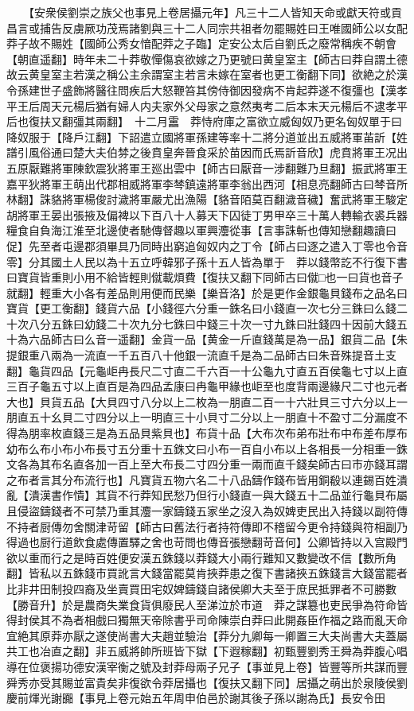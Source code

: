 　　【安衆侯劉崇之族父也事見上卷居攝元年】凡三十二人皆知天命或獻天符或貢昌言或捕告反虜厥功茂焉諸劉與三十二人同宗共祖者勿罷賜姓曰王唯國師公以女配莽子故不賜姓【國師公秀女愔配莽之子臨】定安公太后自劉氏之廢常稱疾不朝會【朝直遥翻】時年未二十莽敬憚傷哀欲嫁之乃更號曰黄皇室主【師古曰莽自謂土德故云黄皇室主若漢之稱公主余謂室主若言未嫁在室者也更工衡翻下同】欲絶之於漢令孫建世子盛飾將醫往問疾后大怒鞭笞其傍侍御因發病不肯起莽遂不復彊也【漢孝平王后周天元楊后猶有婦人内夫家外父母家之意然夷考二后本末天元楊后不逮孝平后也復扶又翻彊其兩翻】　十二月靁　莽恃府庫之富欲立威匈奴乃更名匈奴單于曰降奴服于【降戶江翻】下詔遣立國將軍孫建等率十二將分道並出五威將軍苖訢【姓譜引風俗通曰楚大夫伯棼之後賁皇奔晉食采於苗因而氏焉訢音欣】虎賁將軍王况出五原厭難將軍陳欽震狄將軍王廵出雲中【師古曰厭音一涉翻難乃旦翻】振武將軍王嘉平狄將軍王萌出代郡相威將軍李棽鎮遠將軍李翁出西河【相息亮翻師古曰棽音所林翻】誅貉將軍楊俊討濊將軍嚴尤出漁陽【貉音陌莫百翻濊音穢】奮武將軍王駿定胡將軍王晏出張掖及偏裨以下百八十人募天下囚徒丁男甲卒三十萬人轉輸衣裘兵器糧食自負海江淮至北邊使者馳傳督趣以軍興灋從事【言事誅斬也傳知戀翻趣讀曰促】先至者屯邊郡須畢具乃同時出窮追匈奴内之丁令【師占曰逐之遣入丁零也令音零】分其國土人民以為十五立呼韓邪子孫十五人皆為單于　莽以錢幣訖不行復下書曰寶貨皆重則小用不給皆輕則僦載煩費【復扶又翻下同師古曰僦□也一曰貨也音子就翻】輕重大小各有差品則用便而民樂【樂音洛】於是更作金銀龜貝錢布之品名曰寶貨【更工衡翻】錢貨六品【小錢徑六分重一銖名曰小錢直一次七分三銖曰么錢二十次八分五銖曰幼錢二十次九分七銖曰中錢三十次一寸九銖曰壯錢四十因前大錢五十為六品師古曰么音一遥翻】金貨一品【黄金一斤直錢萬是為一品】銀貨二品【朱提銀重八兩為一流直一千五百八十他銀一流直千是為二品師古曰朱音殊提音土支翻】龜貨四品【元龜岠冉長尺二寸直二千六百一十公龜九寸直五百侯龜七寸以上直三百子龜五寸以上直百是為四品孟康曰冉龜甲緣也岠至也度背兩邊緣尺二寸也元者大也】貝貨五品【大貝四寸八分以上二枚為一朋直二百一十六壯貝三寸六分以上一朋直五十幺貝二寸四分以上一明直三十小貝寸二分以上一朋直十不盈寸二分漏度不得為朋率枚直錢三是為五品貝紫貝也】布貨十品【大布次布弟布壯布中布差布厚布幼布么布小布小布長寸五分重十五銖文曰小布一百自小布以上各相長一分相重一銖文各為其布名直各加一百上至大布長二寸四分重一兩而直千錢矣師古曰市亦錢耳謂之布者言其分布流行也】凡寶貨五物六名二十八品鑄作錢布皆用銅殽以連錫百姓潰亂【潰漢書作憒】其貨不行莽知民愁乃但行小錢直一與大錢五十二品並行龜貝布屬且侵盜鑄錢者不可禁乃重其灋一家鑄錢五家坐之沒入為奴婢吏民出入持錢以副符傳不持者厨傳勿舍關津苛留【師古曰舊法行者持符傳即不稽留今更令持錢與符相副乃得過也厨行道飲食處傳置驛之舍也苛問也傳音張戀翻苛音何】公卿皆持以入宫殿門欲以重而行之是時百姓便安漢五銖錢以莽錢大小兩行難知又數變改不信【數所角翻】皆私以五銖錢市買訛言大錢當罷莫肯挾莽患之復下書諸挾五銖錢言大錢當罷者比非井田制投四裔及坐賣買田宅奴婢鑄錢自諸侯卿大夫至于庶民抵罪者不可勝數【勝音升】於是農商失業食貨俱廢民人至涕泣於市道　莽之謀簒也吏民爭為符命皆得封侯其不為者相戲曰獨無天帝除書乎司命陳崇白莽曰此開姦臣作福之路而亂天命宜絶其原莽亦厭之遂使尚書大夫趙並驗治【莽分九卿每一卿置三大夫尚書大夫蓋屬共工也冶直之翻】非五威將帥所班皆下獄【下遐稼翻】初甄豐劉秀王舜為莽腹心唱導在位褒揚功德安漢宰衡之號及封莽母兩子兄子【事並見上卷】皆豐等所共謀而豐舜秀亦受其賜並富貴矣非復欲令莽居攝也【復扶又翻下同】居攝之萌出於泉陵侯劉慶前煇光謝嚻【事見上卷元始五年周申伯邑於謝其後子孫以謝為氏】長安令田